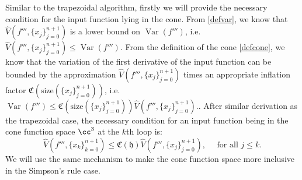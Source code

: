 \documentclass[draft]{iitthesis}
\DeclareMathOperator{\Var}{Var}
\theoremstyle{definition}
\theoremstyle{remark}
\begin{document}
Similar to the trapezoidal algorithm, firstly we will provide the necessary condition for the input function lying in the cone. From \eqref{defvar}, we know that $\widehat{V}({f'''},\{x_j\}_{j=0}^{n+1})$ is a lower bound on $\Var({f'''})$, i.e. $\widehat{V}({f'''},\{x_j\}_{j=0}^{n+1})\leq \Var({f'''})$. From the definition of the cone \eqref{defcone}, we know that the variation of the first derivative of the input function can be bounded by the approximation $\widehat{V}({f'''},\{x_j\}_{j=0}^{n+1})$ times an appropriate inflation factor $\mathfrak{C}(\text{size}(\{x_j\}_{j=0}^{n+1}))$, i.e. $\Var({f'''})\leq \mathfrak{C}(\text{size}(\{x_j\}_{j=0}^{n+1}))\widehat{V}({f'''},\{x_j\}_{j=0}^{n+1}).$. After similar derivation as the trapezoidal case, the necessary condition for an input function being in the cone function space $\cc^3$ at the $k$th loop is:
\begin{equation}\label{necconsim}
    \widehat{V}({f'''},\{x_k\}_{k=0}^{n+1})\leq\mathfrak{C}(\mathfrak{h})\widehat{V}({f'''},\{x_j\}_{j=0}^{n+1}), \quad \text{ for all } j \leq k.
\end{equation}
We will use the same mechanism to make the cone function space more inclusive in the Simpson's rule case.
\end{document}
